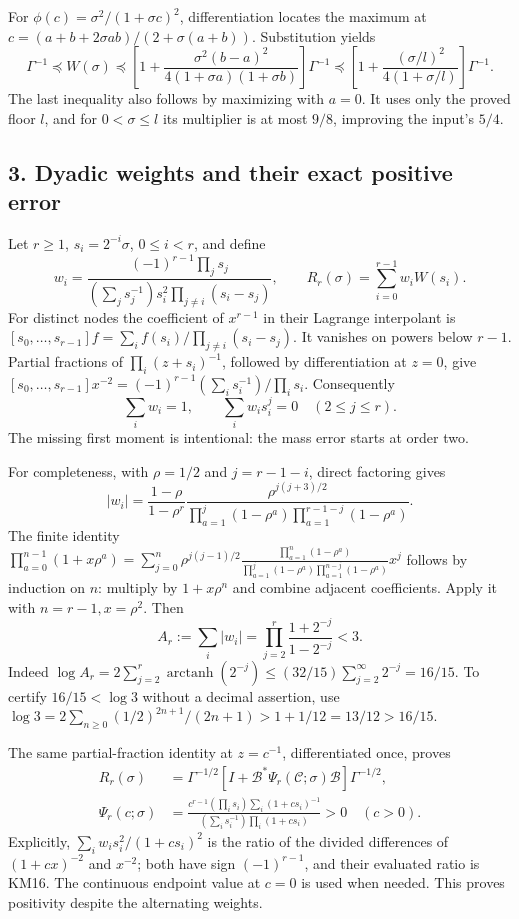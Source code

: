 \documentclass[11pt]{article}
\begin{document}
For \(\phi(c)=\sigma^2/(1+\sigma c)^2\), differentiation locates the maximum at \(c=(a+b+2\sigma ab)/(2+\sigma(a+b))\). Substitution yields \[
 \Gamma^{-1}\preceq W(\sigma)\preceq
 \left[1+\frac{\sigma^2(b-a)^2}
 {4(1+\sigma a)(1+\sigma b)}\right]\Gamma^{-1}
 \preceq\left[1+\frac{(\sigma/l)^2}{4(1+\sigma/l)}\right]\Gamma^{-1}.
 \tag{KM12}
\] The last inequality also follows by maximizing with \(a=0\). It uses only the proved floor \(l\), and for \(0<\sigma\le l\) its multiplier is at most \(9/8\), improving the input's \(5/4\).

\subsection{3. Dyadic weights and their exact positive error}\label{dyadic-weights-and-their-exact-positive-error}

Let \(r\ge1\), \(s_i=2^{-i}\sigma\), \(0\le i<r\), and define \[
 w_i=\frac{(-1)^{r-1}\prod_j s_j}
 {(\sum_j s_j^{-1})s_i^2\prod_{j\ne i}(s_i-s_j)},\qquad
 R_r(\sigma)=\sum_{i=0}^{r-1}w_iW(s_i).
 \tag{KM13}
\] For distinct nodes the coefficient of \(x^{r-1}\) in their Lagrange interpolant is \([s_0,\ldots,s_{r-1}]f=\sum_i f(s_i)/\prod_{j\ne i}(s_i-s_j)\). It vanishes on powers below \(r-1\). Partial fractions of \(\prod_i(z+s_i)^{-1}\), followed by differentiation at \(z=0\), give \([s_0,\ldots,s_{r-1}]x^{-2}
=(-1)^{r-1}(\sum_i s_i^{-1})/\prod_i s_i\). Consequently \[
 \sum_iw_i=1,\qquad\sum_iw_i s_i^j=0\quad(2\le j\le r).
 \tag{KM14}
\] The missing first moment is intentional: the mass error starts at order two.

For completeness, with \(\rho=1/2\) and \(j=r-1-i\), direct factoring gives \[
 |w_i|=\frac{1-\rho}{1-\rho^r}
 \frac{\rho^{j(j+3)/2}}
 {\prod_{a=1}^{j}(1-\rho^a)\prod_{a=1}^{r-1-j}(1-\rho^a)}.
\] The finite identity \(\prod_{a=0}^{n-1}(1+x\rho^a)
=\sum_{j=0}^n\rho^{j(j-1)/2}
\frac{\prod_{a=1}^n(1-\rho^a)}
{\prod_{a=1}^j(1-\rho^a)\prod_{a=1}^{n-j}(1-\rho^a)}x^j\) follows by induction on \(n\): multiply by \(1+x\rho^n\) and combine adjacent coefficients. Apply it with \(n=r-1,x=\rho^2\). Then \[
 A_r:=\sum_i|w_i|=\prod_{j=2}^{r}\frac{1+2^{-j}}{1-2^{-j}}<3.
 \tag{KM15}
\] Indeed \(\log A_r=2\sum_{j=2}^r\operatorname{arctanh}(2^{-j})
\le(32/15)\sum_{j=2}^\infty2^{-j}=16/15\). To certify \(16/15<\log3\) without a decimal assertion, use \(\log3=2\sum_{n\ge0}(1/2)^{2n+1}/(2n+1)>1+1/12=13/12>16/15\).

The same partial-fraction identity at \(z=c^{-1}\), differentiated once, proves \[
 \begin{split}
 R_r(\sigma)&=\Gamma^{-1/2}
 [I+\mathcal B^*\Psi_r(\mathcal C;\sigma)\mathcal B]\Gamma^{-1/2},\\
 \Psi_r(c;\sigma)&=
 \frac{c^{r-1}(\prod_i s_i)\sum_i(1+cs_i)^{-1}}
 {(\sum_i s_i^{-1})\prod_i(1+cs_i)}>0\quad(c>0).
 \end{split}
 \tag{KM16}
\] Explicitly, \(\sum_iw_i s_i^2/(1+cs_i)^2\) is the ratio of the divided differences of \((1+cx)^{-2}\) and \(x^{-2}\); both have sign \((-1)^{r-1}\), and their evaluated ratio is KM16. The continuous endpoint value at \(c=0\) is used when needed. This proves positivity despite the alternating weights.
\end{document}
